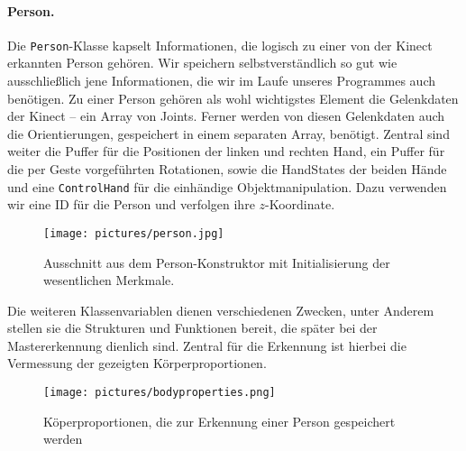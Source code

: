	\paragraph{Person.} Die \texttt{Person}-Klasse kapselt Informationen, die logisch zu einer von der Kinect erkannten Person gehören. Wir speichern selbstverständlich so gut wie ausschließlich jene Informationen, die wir im Laufe unseres Programmes auch benötigen. Zu einer Person gehören als wohl wichtigstes Element die Gelenkdaten der Kinect -- ein Array von Joints. Ferner werden von diesen Gelenkdaten auch die Orientierungen, gespeichert in einem separaten Array, benötigt. Zentral sind weiter die Puffer für die Positionen der linken und rechten Hand, ein Puffer für die per Geste vorgeführten Rotationen, sowie die HandStates der beiden Hände und eine \glqq \texttt{ControlHand}\grqq{} für die einhändige Objektmanipulation. Dazu verwenden wir eine ID für die Person und verfolgen ihre $z$-Koordinate. 
	\begin{figure}[h]
	\centering
	\texttt{[image: pictures/person.jpg]}
	\caption{Ausschnitt aus dem Person-Konstruktor mit Initialisierung der wesentlichen Merkmale.}
	\end{figure}\par\medskip
	
	Die weiteren Klassenvariablen dienen verschiedenen Zwecken, unter Anderem stellen sie die Strukturen und Funktionen bereit, die später bei der Mastererkennung dienlich sind. Zentral für die Erkennung ist hierbei die Vermessung der gezeigten Körperproportionen.
	\begin{figure}[h]
	\centering
	\texttt{[image: pictures/bodyproperties.png]}
	\caption{Köperproportionen, die zur Erkennung einer Person gespeichert werden}
	\end{figure}\par\medskip
	
